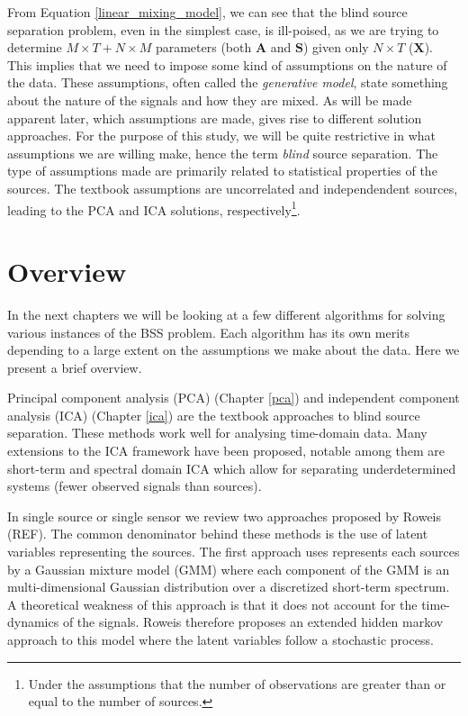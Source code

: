 \documentclass[11pt, oneside, a4paper]{report}
\begin{document}
From Equation \ref{linear_mixing_model}, we can see that the blind
source separation problem, even in the simplest case, is ill-poised,
as we are trying to determine $M\times T + N\times M$ parameters (both
$\boldsymbol{A}$ and $\boldsymbol{S}$) given only $N\times T$
($\boldsymbol{X}$). This implies that we need to impose some kind of
assumptions on the nature of the data. These assumptions, often called
the \emph{generative model}, state something about the nature of the
signals and how they are mixed. As will be made apparent later, which
assumptions are made, gives rise to different solution approaches. For
the purpose of this study, we will be quite restrictive in what
assumptions we are willing make, hence the term \emph{blind} source
separation. The type of assumptions made are primarily related to
statistical properties of the sources. The textbook assumptions are
uncorrelated and independendent sources, leading to the PCA and ICA
solutions, respectively\footnote{Under the assumptions that the number 
of observations are greater than or equal to the number of sources.}.




\section{Overview}

In the next chapters we will be looking at a few different algorithms
for solving various instances of the BSS problem. Each algorithm has
its own merits depending to a large extent on the assumptions we make
about the data. Here we present a brief overview.

Principal component analysis (PCA) (Chapter \ref{pca}) and independent
component analysis (ICA) (Chapter \ref{ica}) are the textbook approaches to blind source separation. These
methods work well for analysing time-domain data. Many extensions to
the ICA framework have been proposed, notable among them are
short-term and spectral domain ICA which allow for separating
underdetermined systems (fewer observed signals than sources). 

In single source or single sensor we review two approaches proposed by
Roweis (REF). The common denominator behind these methods is the use
of latent variables representing the sources. The first approach uses
represents each sources by a Gaussian mixture model (GMM) where each component
of the GMM is an multi-dimensional Gaussian distribution over a
discretized short-term spectrum. A theoretical weakness of this
approach is that it does not account for the time-dynamics of the
signals. Roweis therefore proposes an extended hidden markov approach
to this model where the latent variables follow a stochastic process. 
\end{document}
